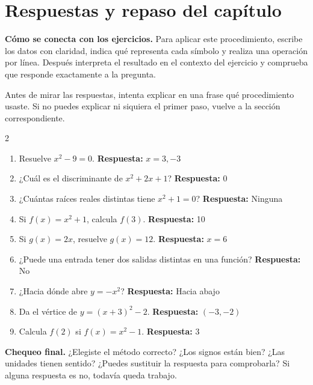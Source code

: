 \documentclass[10pt,oneside,openany]{book}
\begin{document}
\section{Respuestas y repaso del capítulo}

\textbf{Cómo se conecta con los ejercicios.} Para aplicar este procedimiento, escribe los datos con claridad, indica qué representa cada símbolo y realiza una operación por línea. Después interpreta el resultado en el contexto del ejercicio y comprueba que responde exactamente a la pregunta.

Antes de mirar las respuestas, intenta explicar en una frase qué procedimiento usaste. Si no puedes explicar ni siquiera el primer paso, vuelve a la sección correspondiente.

\begin{multicols}{2}\begin{enumerate}

\item Resuelve $x^2-9=0$. \textbf{Respuesta:} $x=3,-3$

\item ¿Cuál es el discriminante de $x^2+2x+1$? \textbf{Respuesta:} 0

\item ¿Cuántas raíces reales distintas tiene $x^2+1=0$? \textbf{Respuesta:} Ninguna

\item Si $f(x)=x^2+1$, calcula $f(3)$. \textbf{Respuesta:} 10

\item Si $g(x)=2x$, resuelve $g(x)=12$. \textbf{Respuesta:} $x=6$

\item ¿Puede una entrada tener dos salidas distintas en una función? \textbf{Respuesta:} No

\item ¿Hacia dónde abre $y=-x^2$? \textbf{Respuesta:} Hacia abajo

\item Da el vértice de $y=(x+3)^2-2$. \textbf{Respuesta:} $(-3,-2)$

\item Calcula $f(2)$ si $f(x)=x^2-1$. \textbf{Respuesta:} 3

\end{enumerate}\end{multicols}

\begin{idea}\textbf{Chequeo final.} ¿Elegiste el método correcto? ¿Los signos están bien? ¿Las unidades tienen sentido? ¿Puedes sustituir la respuesta para comprobarla? Si alguna respuesta es no, todavía queda trabajo.\end{idea}
\end{document}
